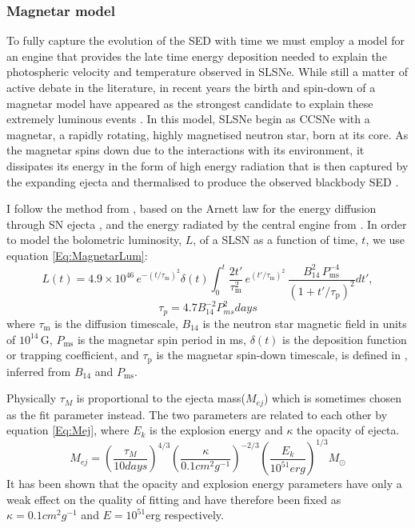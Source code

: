 \subsubsection{Magnetar model} \label{sec:Magnetar}
To fully capture the evolution of the SED with time we must employ a model for an engine that provides the late time energy deposition needed to explain the photospheric velocity and temperature observed in SLSNe. While still a matter of active debate in the literature, in recent years the birth and spin-down of a magnetar model have appeared as the strongest candidate to explain these extremely luminous events \citep{Inserra2013,Nicholl2013}. In this model, SLSNe begin as CCSNe with a magnetar, a rapidly rotating, highly magnetised neutron star, born at its core. As the magnetar spins down due to the interactions with its environment, it dissipates its energy in the form of high energy radiation that is then captured by the expanding ejecta and thermalised to produce the observed blackbody SED \citep{Kasen2009,Woosley2010,Inserra2013}.

I follow the method from \citet{Inserra2013}, based on the Arnett law for the energy diffusion through SN ejecta \citep{Arnett1982}, and the energy radiated by the central engine from \citet{Kasen2009,Woosley2010}. In order to model the bolometric luminosity, $L$, of a SLSN as a function of time, $t$, we use equation \ref{Eq:MagnetarLum}:
\begin{equation}
L(t) = 4.9\times 10^{46}\,e^{ -(t / \tau_\mathrm{m})^2 }\delta(t) \int_{0}^{t} \frac{2t'}{\tau_\mathrm{m}^2}\,e^{(t'/\tau_\mathrm{m})^2}\,\frac{B_{14}^{2}\,P_{\mathrm{ms}}^{-4}}{\left(1+t'/\tau_\mathrm{p}\right)^2} dt',
\label{Eq:MagnetarLum}
\end{equation}
\begin{equation}
\label{Eq:SDPeriod}
\tau_{p} = 4.7B_{14}^{-2}P_{ms}^{2}days
\end{equation}
\noindent where $\tau_\mathrm{m}$ is the diffusion timescale, $B_{14}$ is the neutron star magnetic field in units of $10^{14}$\,G, $P_{\mathrm{ms}}$ is the magnetar spin period in ms, $\delta(t)$ is the deposition function or trapping coefficient, and $\tau_\mathrm{p}$ is the magnetar spin-down timescale, is defined in , inferred from $B_{14}$ and $P_{\mathrm{ms}}$.

Physically $\tau_M$ is proportional to the ejecta mass($M_{ej}$) which is sometimes chosen as the fit parameter instead. The two parameters are related to each other by equation \ref{Eq:Mej}, where $E_k$ is the explosion energy and $\kappa$ the opacity of ejecta.
\begin{equation}
\label{Eq:Mej}
M_{ej} = (\frac{\tau_{M}}{10days})^{4/3}(\frac{\kappa}{0.1cm^2g^{-1}})^{-2/3}(\frac{E_k}{10^{51}erg})^{1/3}M_{\odot}
\end{equation}
\noindent It has been shown \citep{Inserra2013,Inserra2014,Nicholl2015,Papadopoulos2015} that the opacity and explosion energy parameters have only a weak effect on the quality of fitting and have therefore been fixed as $\kappa = 0.1cm^2g^{-1}$ and $E = 10^{51}$erg respectively.

